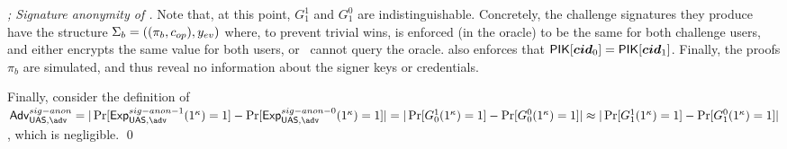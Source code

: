 \begin{proof}[; Signature anonymity of \CUASGen]
  Note that, at this point, $G_1^1$ and $G_1^0$ are indistinguishable.
  Concretely, the challenge signatures they produce have the structure $\Sigma_b =
  ((\pi_b,c_{op}),y_{ev})$ where, to prevent trivial wins, \yeval is enforced
  (in the \SIGN oracle) to be the same for both challenge users, and \cinsp
  either encrypts the same value for both users, or \adv~cannot query the \OPEN
  oracle. \SIGN also enforces that $\mathsf{P}\mathsf{IK}[\boldsymbol{cid}_0] = \mathsf{P}\mathsf{IK}[\boldsymbol{cid}_1]$. Finally,
  the proofs $\pi_b$ are simulated, and thus reveal no information about the
  signer keys or credentials.

  Finally, consider the definition of $\AdvSigAnon=|\Pr\lbrack
  \ExpSigAnono(1^\secpar)=1\rbrack-\Pr\lbrack\ExpSigAnonz(1^\secpar)=1\rbrack|
  = |\Pr\lbrack G_0^1(1^\secpar)=1\rbrack-\Pr\lbrack
  G_0^0(1^\secpar)=1\rbrack| \approx
  |\Pr\lbrack G_1^1(1^\secpar)=1\rbrack-\Pr\lbrack
  G_1^0(1^\secpar)=1\rbrack|$, which is negligible.
  \qed
\end{proof}



  
